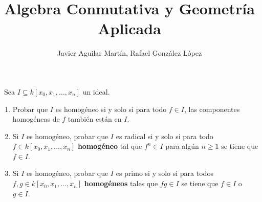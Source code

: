 \documentclass[twoside]{article}
\begin{document}
\title{Algebra Conmutativa y Geometría Aplicada}
\author{Javier Aguilar Martín, Rafael González López}
\maketitle

\begin{ejercicio}{1}\
Sea $I \subseteq k[x_0, x_1,\dots, x_n]$ un ideal.
\begin{enumerate}
\item Probar que $I$ es homogéneo si y solo si para todo $f \in I$, las
componentes
homogéneas de $f$ también están en $I$.
\item  Si $I$ es homogéneo, probar que $I$ es radical si y solo si para todo $f \in k[x_0, x_1,\dots, x_n]$
\textbf{homogéneo} tal que $f^n \in I$ para algún $n \geq 1$ se tiene que $f \in I$.
\item Si $I$ es homogéneo, probar que $I$ es primo si y solo si para todos $f, g \in
k[x_0, x_1,\dots, x_n]$ \textbf{homogéneos} tales que $fg \in I$ se tiene que $f \in I$ o $g \in I$.
\end{enumerate}
\end{ejercicio}
\end{document}
